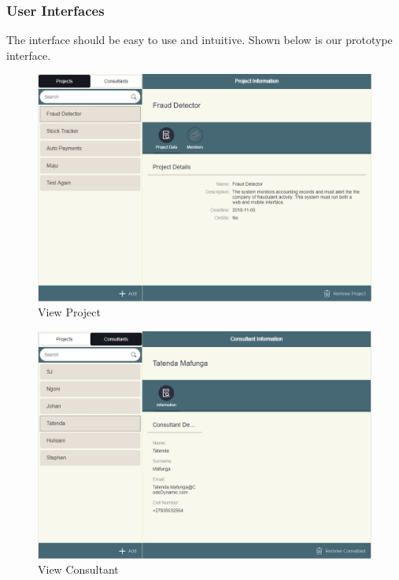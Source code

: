 \documentclass[a4paper, 12pt, oneside]{article}
\begin{document}
\subsubsection{User Interfaces}
The interface should be easy to use and intuitive. Shown below is our prototype interface.
\begin{figure}[h!]
  \centering
  \includegraphics[width=\linewidth]{images/viewProject.PNG}
  \caption{View Project}
  \label{fig:sfig1}
\end{figure}

\begin{figure}[h!]
  \centering
  \includegraphics[width=\linewidth]{images/viewConsultant.PNG}
  \caption{View Consultant}
  \label{fig:sfig1}
\end{figure}
\end{document}
